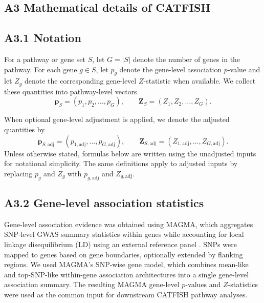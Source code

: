 \documentclass[unnumsec,webpdf,contemporary,large]{oup-authoring-template}%
\theoremstyle{thmstyleone}%
\theoremstyle{thmstyletwo}%
\theoremstyle{thmstylethree}%
\begin{document}
\begin{appendices}



\section{A3 Mathematical details of CATFISH}\label{app:catfish_math}

\subsection{A3.1 Notation}

For a pathway or gene set $S$, let $G=|S|$ denote the number of genes in the pathway. For each gene $g \in S$, let $p_g$ denote the gene-level association $p$-value and let $Z_g$ denote the corresponding gene-level $Z$-statistic when available. We collect these quantities into pathway-level vectors
\[
\mathbf{p}_S = (p_1, p_2, \dots, p_G),
\qquad
\mathbf{Z}_S = (Z_1, Z_2, \dots, Z_G).
\]

When optional gene-level adjustment is applied, we denote the adjusted quantities by
\[
\mathbf{p}_{S,\mathrm{adj}} =
(p_{1,\mathrm{adj}}, \dots, p_{G,\mathrm{adj}}),
\qquad
\mathbf{Z}_{S,\mathrm{adj}} =
(Z_{1,\mathrm{adj}}, \dots, Z_{G,\mathrm{adj}}).
\]
Unless otherwise stated, formulas below are written using the unadjusted inputs for notational simplicity. The same definitions apply to adjusted inputs by replacing $p_g$ and $Z_g$ with $p_{g,\mathrm{adj}}$ and $Z_{g,\mathrm{adj}}$.

\subsection{A3.2 Gene-level association statistics}

Gene-level association evidence was obtained using MAGMA, which aggregates SNP-level GWAS summary statistics within genes while accounting for local linkage disequilibrium (LD) using an external reference panel \citep{deLeeuw2015}. SNPs were mapped to genes based on gene boundaries, optionally extended by flanking regions. We used MAGMA's SNP-wise gene model, which combines mean-like and top-SNP-like within-gene association architectures into a single gene-level association summary. The resulting MAGMA gene-level $p$-values and $Z$-statistics were used as the common input for downstream CATFISH pathway analyses.


\end{appendices}
\end{document}
